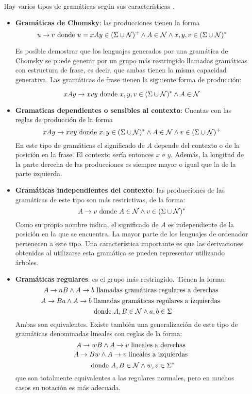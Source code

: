 Hay varios tipos de gramáticas según sus características \cite{aho1986compilers}.
\begin{itemize}
\item \textbf{Gramáticas de Chomsky}: las producciones tienen la forma \[u \rightarrow v \textup{ donde } u=xAy \in (\Sigma \cup \mathcal{N})^{+} \wedge A \in \mathcal{N} \wedge x, y, v \in (\Sigma \cup \mathcal{N})^{*}\]

Es posible demostrar que los lenguajes generados por una gramática de Chomsky se puede generar por un grupo más restringido llamadas gramáticas con estructura de frase, es decir, que ambas tienen la misma capacidad generativa. Las gramáticas de frase tienen la siguiente forma de producción:

\[xAy \rightarrow xvy \textup{ donde } x,y,v \in (\Sigma \cup \mathcal{N})^{*} \wedge A \in \mathcal{N}\]
\item \textbf{Gramaticas dependientes o sensibles al contexto}: Cuentas con las reglas de producción de la forma  \[xAy \rightarrow xvy \textup{ donde } x, y \in (\Sigma \cup \mathcal{N})^{*} \wedge A \in \mathcal{N} \wedge v \in (\Sigma \cup \mathcal{N})^{+}\]
En este tipo de gramáticas el significado de $A$ depende del contexto o de la posición en la frase. El contexto sería entonces $x$ e $y$. Además, la longitud de la parte derecha de las producciones es siempre mayor o igual que la de la parte izquierda.
\item \textbf{Gramáticas independientes del contexto}: las producciones de las gramáticas de este tipo son más restrictivas, de la forma: 
\[A \rightarrow v \textup{ donde } A \in \mathcal{N} \wedge v \in (\Sigma \cup \mathcal{N})^{*}\]
Como su propio nombre indica, el significado de $A$ es independiente de la posición en la que se encuentra. La mayor parte de los lenguajes de ordenador pertenecen a este tipo. Una característica importante es que las derivaciones obtenidas al utilizarse esta gramática se pueden representar utilizando árboles.

\item \textbf{Gramáticas regulares}: es el grupo más restringido. Tienen la forma: \[A \rightarrow aB \wedge A \rightarrow b \textup{ llamadas gramáticas regulares a derechas } \]
\[A \rightarrow Ba \wedge A \rightarrow b \textup{ llamadas gramáticas regulares a izquierdas } \]
\[ \textup{ donde }A, B \in \mathcal{N} \wedge a,b \in \Sigma  \]
Ambas son equivalentes. Existe también una generalización de este tipo de gramáticas denominadas lineales con reglas de la forma: \[A \rightarrow wB \wedge A \rightarrow v \textup{ lineales a derechas } \]
\[A \rightarrow Bw \wedge A \rightarrow v \textup{ lineales a izquierdas } \]
\[ \textup{ donde }A, B \in \mathcal{N} \wedge w,v \in \Sigma^{*}  \]
que son totalmente equivalentes a las regulares normales, pero en muchos casos su notación es más adecuada.
\end{itemize}

